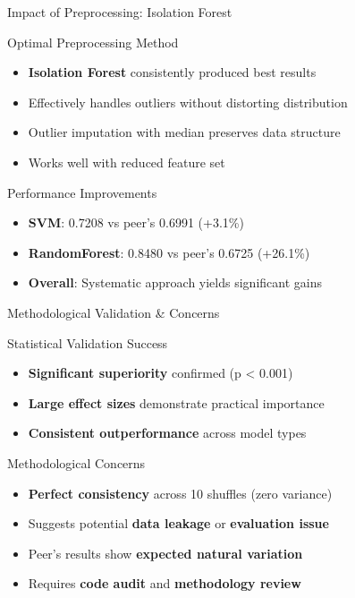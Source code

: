 \documentclass[10pt]{beamer}
\begin{document}
{\begin{frame}{Impact of Preprocessing: Isolation Forest}
\begin{block}{Optimal Preprocessing Method}
\begin{itemize}
    \item \textbf{Isolation Forest} consistently produced best results
    \item Effectively handles outliers without distorting distribution
    \item Outlier imputation with median preserves data structure
    \item Works well with reduced feature set
\end{itemize}
\end{block}

\begin{block}{Performance Improvements}
\begin{itemize}
    \item \textbf{SVM}: 0.7208 vs peer's 0.6991 (+3.1\%)
    \item \textbf{RandomForest}: 0.8480 vs peer's 0.6725 (+26.1\%)
    \item \textbf{Overall}: Systematic approach yields significant gains
\end{itemize}
\end{block}
\end{frame}

\begin{frame}{Methodological Validation \& Concerns}
\begin{block}{Statistical Validation Success}
\begin{itemize}
    \item \textbf{Significant superiority} confirmed (p < 0.001)
    \item \textbf{Large effect sizes} demonstrate practical importance
    \item \textbf{Consistent outperformance} across model types
\end{itemize}
\end{block}

\begin{alertblock}{Methodological Concerns}
\begin{itemize}
    \item \textbf{Perfect consistency} across 10 shuffles (zero variance)
    \item Suggests potential \textbf{data leakage} or \textbf{evaluation issue}
    \item Peer's results show \textbf{expected natural variation}
    \item Requires \textbf{code audit} and \textbf{methodology review}
\end{itemize}
\end{alertblock}
\end{frame}

}
\end{document}
